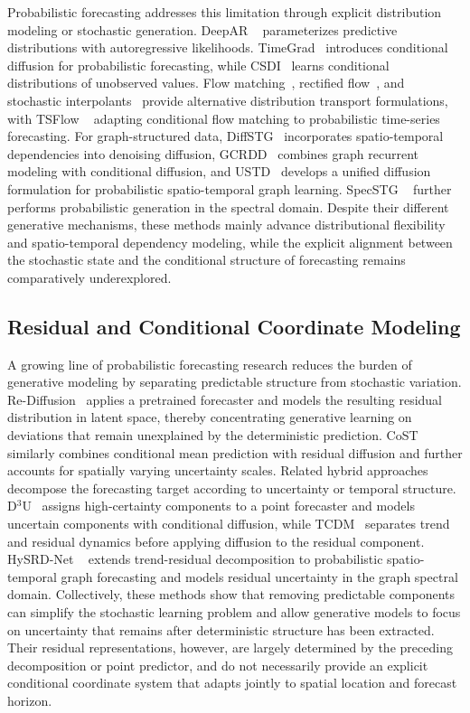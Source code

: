 \documentclass[sigconf, anonymous, review]{acmart}
\begin{document}
Probabilistic forecasting addresses this limitation through explicit
distribution modeling or stochastic generation. DeepAR
~\cite{salinas2020deepar} parameterizes predictive distributions with
autoregressive likelihoods. TimeGrad~\cite{rasul2021timegrad} introduces
conditional diffusion for probabilistic forecasting, while
CSDI~\cite{tashiro2021csdi} learns conditional distributions of
unobserved values. Flow matching~\cite{lipman2023flow}, rectified
flow~\cite{liu2023rectified}, and stochastic
interpolants~\cite{albergo2025stochastic} provide alternative
distribution transport formulations, with TSFlow
~\cite{kollovieh2025tsflow} adapting conditional flow matching to
probabilistic time-series forecasting. For graph-structured data,
DiffSTG~\cite{wen2023diffstg} incorporates spatio-temporal dependencies
into denoising diffusion, GCRDD~\cite{li2023gcrdd} combines graph
recurrent modeling with conditional diffusion, and
USTD~\cite{hu2024unifying} develops a unified diffusion formulation for
probabilistic spatio-temporal graph learning. SpecSTG
~\cite{lin2025specstg} further performs probabilistic generation in the
spectral domain. Despite their different generative mechanisms, these
methods mainly advance distributional flexibility and spatio-temporal
dependency modeling, while the explicit alignment between the
stochastic state and the conditional structure of forecasting remains
comparatively underexplored.

\subsection{Residual and Conditional Coordinate Modeling}

A growing line of probabilistic forecasting research reduces the burden
of generative modeling by separating predictable structure from
stochastic variation. Re-Diffusion~\cite{zhang2026rediffusion} applies a
pretrained forecaster and models the resulting residual distribution in
latent space, thereby concentrating generative learning on deviations
that remain unexplained by the deterministic prediction.
CoST~\cite{sheng2026cost} similarly combines conditional mean prediction
with residual diffusion and further accounts for spatially varying
uncertainty scales. Related hybrid approaches decompose the forecasting
target according to uncertainty or temporal structure.
D$^3$U~\cite{li2025d3u} assigns high-certainty components to a point
forecaster and models uncertain components with conditional diffusion,
while TCDM~\cite{xu2025tcdm} separates trend and residual dynamics
before applying diffusion to the residual component. HySRD-Net
~\cite{chen2026hysrd} extends trend-residual decomposition to
probabilistic spatio-temporal graph forecasting and models residual
uncertainty in the graph spectral domain. Collectively, these methods
show that removing predictable components can simplify the stochastic
learning problem and allow generative models to focus on uncertainty
that remains after deterministic structure has been extracted. Their
residual representations, however, are largely determined by the
preceding decomposition or point predictor, and do not necessarily
provide an explicit conditional coordinate system that adapts jointly
to spatial location and forecast horizon.
\end{document}

